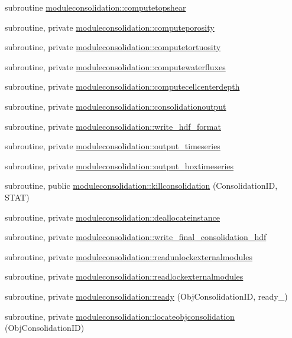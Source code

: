 \begin{DoxyCompactItemize}
\item 
subroutine \mbox{\hyperlink{namespacemoduleconsolidation_a414e2c5a165b95dd5af3741e90f53de4}{moduleconsolidation\+::computetopshear}}
\item 
subroutine, private \mbox{\hyperlink{namespacemoduleconsolidation_a71e8c451239a619147b24a85ae396e8e}{moduleconsolidation\+::computeporosity}}
\item 
subroutine, private \mbox{\hyperlink{namespacemoduleconsolidation_a3d7e2a533ad1c35b0dd1288ee25569b1}{moduleconsolidation\+::computetortuosity}}
\item 
subroutine, private \mbox{\hyperlink{namespacemoduleconsolidation_a28f20455e31c2730b280db8d666f0ce3}{moduleconsolidation\+::computewaterfluxes}}
\item 
subroutine, private \mbox{\hyperlink{namespacemoduleconsolidation_a3620cbc84f4868b17ace877ad56c903e}{moduleconsolidation\+::computecellcenterdepth}}
\item 
subroutine, private \mbox{\hyperlink{namespacemoduleconsolidation_ade260a3416dd427c11f719144f5eb362}{moduleconsolidation\+::consolidationoutput}}
\item 
subroutine, private \mbox{\hyperlink{namespacemoduleconsolidation_ae7ca7200e9ac29d962cff15374878a4e}{moduleconsolidation\+::write\+\_\+hdf\+\_\+format}}
\item 
subroutine, private \mbox{\hyperlink{namespacemoduleconsolidation_aaca2f5ea993ad6f34b1699f8fccfe168}{moduleconsolidation\+::output\+\_\+timeseries}}
\item 
subroutine, private \mbox{\hyperlink{namespacemoduleconsolidation_a18a3f871c1e0bfbadc4c99e69e5216ec}{moduleconsolidation\+::output\+\_\+boxtimeseries}}
\item 
subroutine, public \mbox{\hyperlink{namespacemoduleconsolidation_accff619eab55fc89b79de8070dbd7001}{moduleconsolidation\+::killconsolidation}} (Consolidation\+ID, S\+T\+AT)
\item 
subroutine, private \mbox{\hyperlink{namespacemoduleconsolidation_ac59ee6a9bf70ef4f2f509cc55bb5b242}{moduleconsolidation\+::deallocateinstance}}
\item 
subroutine, private \mbox{\hyperlink{namespacemoduleconsolidation_abab71f3745fefbe658e80b47d85e3662}{moduleconsolidation\+::write\+\_\+final\+\_\+consolidation\+\_\+hdf}}
\item 
subroutine, private \mbox{\hyperlink{namespacemoduleconsolidation_a146c8502b0f191abd1664acdcd22a4c4}{moduleconsolidation\+::readunlockexternalmodules}}
\item 
subroutine, private \mbox{\hyperlink{namespacemoduleconsolidation_a5157e525fb069b7984e826def43a4dfc}{moduleconsolidation\+::readlockexternalmodules}}
\item 
subroutine, private \mbox{\hyperlink{namespacemoduleconsolidation_ab6b8d86bedc5c2870f1fb998c297005e}{moduleconsolidation\+::ready}} (Obj\+Consolidation\+ID, ready\+\_\+)
\item 
subroutine, private \mbox{\hyperlink{namespacemoduleconsolidation_a782ed1b2a1870dc38bceeca90e360669}{moduleconsolidation\+::locateobjconsolidation}} (Obj\+Consolidation\+ID)
\end{DoxyCompactItemize}
